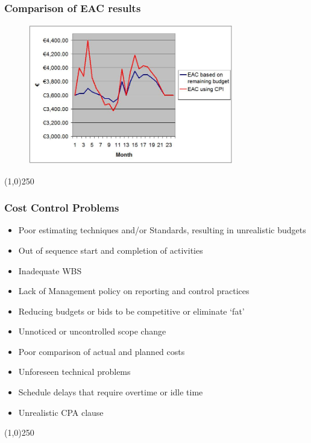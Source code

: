 \begin{frame}
\frametitle{Comparison of EAC results}
\begin{figure}
	\centering
		\includegraphics[width = 9cm]{images/compEAC.jpg}
	\label{fig:compEAC}
\end{figure}
\end{frame}
\begin{center}\line(1,0){250}\end{center}






\begin{frame}
\frametitle{Cost Control Problems}
\begin{itemize}
	\item Poor estimating techniques and/or Standards, resulting in unrealistic budgets
	\item Out of sequence start and completion of activities
	\item Inadequate WBS
	\item Lack of Management policy on reporting and control practices
	\item Reducing budgets or bids to be competitive or eliminate ‘fat’
	\item Unnoticed or uncontrolled scope change
	\item Poor comparison of actual and planned costs
	\item Unforeseen technical problems
	\item Schedule delays that require overtime or idle time
	\item Unrealistic CPA clause
\end{itemize}
\end{frame}
\begin{center}\line(1,0){250}\end{center}






